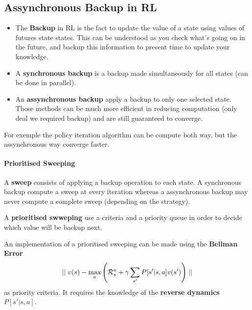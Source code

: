 	\subsection{Assynchronous Backup in RL} %
		\label{sub:assynchronous_backup_in_rl}

		\begin{definition}
			\begin{itemize}
				\item The \textbf{Backup} in RL is the fact to update the value of a state using values of futures state states. This can be understood as you check what's going on in the future, and backup this information to present time to update your knowledge.
				\item A \textbf{synchronous backup} is a backup made simultaneously for all states (can be done in parallel). 
				\item An \textbf{assynchronous backup} apply a backup to only one selected state. Those methods can be much more efficient in reducing computation (only deal we required backup) and are still guaranteed to converge.
			\end{itemize}
		\end{definition}

			For exemple the policy iteration algorithm can be compute both way, but the assynchronous way converge faster. 

		
		\paragraph{Prioritised Sweeping} %
			\label{par:prioritised_sweeping}
			
			\begin{definition}
				A \textbf{sweep} consists of applying a backup operation to each state. A synchronous backup compute a sweep at every iteration whereas a assynchronous backup may never compute a complete sweep (depending on the strategy).

				A \textbf{prioritised swweping} use a criteria and a priority queue in order to decide which value will be backup next.
			\end{definition}

		An implementation of a prioritised sweeping can be made using the \textbf{Bellman Error}
		\[
			\mid \mid v(s) - \max_a \left( \mathcal{R}_s^a + \gamma \sum_{s'} P[s' | s, a] v(s') \right)\mid \mid
		\]
		as priority criteria. It requires the knowledge of the \textbf{reverse dynamics} $ P[s' | s, a] $. 


